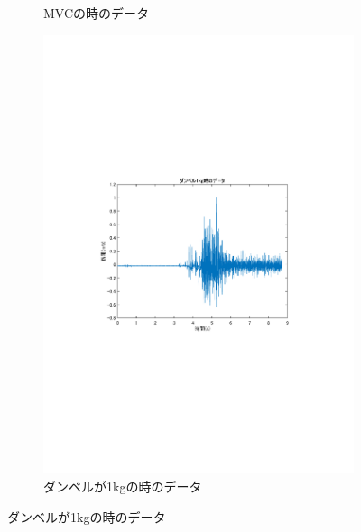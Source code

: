 \documentclass[dvipdfmx, titlepage, t]{jsarticle}
\begin{document}
\begin{figure}[H]
\begin{subfigure}[b]{0.48\linewidth}
        \caption{MVCの時のデータ} %
    \end{subfigure}
    \hfill %
    \begin{subfigure}[b]{0.48\linewidth}
        \centering
        \includegraphics[trim=90 250 100 250 clip,width=\linewidth]{figure/data_1kg.pdf}
        \caption{ダンベルが1kgの時のデータ} %
    \end{subfigure}

    \vspace{1em} %


\end{figure}
\end{document}
